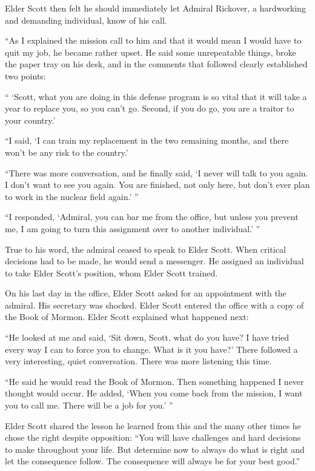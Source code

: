 \documentclass{article}
\begin{document}
Elder Scott then felt he should immediately let Admiral Rickover, a hardworking and demanding individual, know of his call.

``As I explained the mission call to him and that it would mean I would have to quit my job, he became rather upset. He said some unrepeatable things, broke the paper tray on his desk, and in the comments that followed clearly established two points:

`` `Scott, what you are doing in this defense program is so vital that it will take a year to replace you, so you can't go. Second, if you do go, you are a traitor to your country.'

``I said, `I can train my replacement in the two remaining months, and there won't be any risk to the country.'

``There was more conversation, and he finally said, `I never will talk to you again. I don't want to see you again. You are finished, not only here, but don't ever plan to work in the nuclear field again.' ''

``I responded, `Admiral, you can bar me from the office, but unless you prevent me, I am going to turn this assignment over to another individual.' ''

True to his word, the admiral ceased to speak to Elder Scott. When critical decisions had to be made, he would send a messenger. He assigned an individual to take Elder Scott's position, whom Elder Scott trained.

On his last day in the office, Elder Scott asked for an appointment with the admiral. His secretary was shocked. Elder Scott entered the office with a copy of the Book of Mormon. Elder Scott explained what happened next:

``He looked at me and said, `Sit down, Scott, what do you have? I have tried every way I can to force you to change. What is it you have?' There followed a very interesting, quiet conversation. There was more listening this time.

``He said he would read the Book of Mormon. Then something happened I never thought would occur. He added, `When you come back from the mission, I want you to call me. There will be a job for you.' ''

Elder Scott shared the lesson he learned from this and the many other times he chose the right despite opposition: ``You will have challenges and hard decisions to make throughout your life. But determine now to always do what is right and let the consequence follow. The consequence will always be for your best good.''
\end{document}
